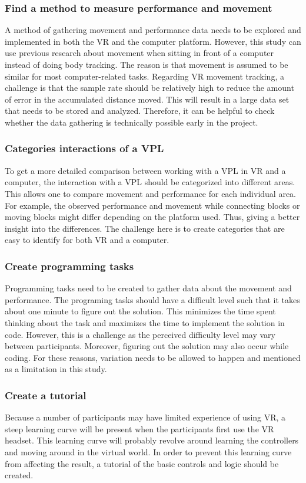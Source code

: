\documentclass{sigchi}
\begin{document}
\subsubsection{Find a method to measure performance and movement}
A method of gathering movement and performance data needs to be explored and implemented in both the VR and the computer platform. However, this study can use previous research about movement when sitting in front of a computer instead of doing body tracking. The reason is that movement is assumed to be similar for most computer-related tasks. Regarding VR movement tracking, a challenge is that the sample rate should be relatively high to reduce the amount of error in the accumulated distance moved. This will result in a large data set that needs to be stored and analyzed. Therefore, it can be helpful to check whether the data gathering is technically possible early in the project. 

\subsubsection{Categories interactions of a VPL}
To get a more detailed comparison between working with a VPL in VR and a computer, the interaction with a VPL should be categorized into different areas. This allows one to compare movement and performance for each individual area. For example, the observed performance and movement while connecting blocks or moving blocks might differ depending on the platform used. Thus, giving a better insight into the differences. The challenge here is to create categories that are easy to identify for both VR and a computer.

\subsubsection{Create programming tasks}
Programming tasks need to be created to gather data about the movement and performance. The programing tasks should have a difficult level such that it takes about one minute to figure out the solution. This minimizes the time spent thinking about the task and maximizes the time to implement the solution in code. However, this is a challenge as the perceived difficulty level may vary between participants. Moreover, figuring out the solution may also occur while coding. For these reasons, variation needs to be allowed to happen and mentioned as a limitation in this study.

\subsubsection{Create a tutorial}
Because a number of participants may have limited experience of using VR, a steep learning curve will be present when the participants first use the VR headset. This learning curve will probably revolve around learning the controllers and moving around in the virtual world. In order to prevent this learning curve from affecting the result, a tutorial of the basic controls and logic should be created.
\end{document}

